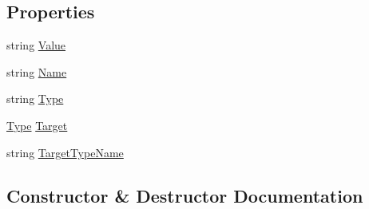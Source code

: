\subsection*{Properties}
\begin{DoxyCompactItemize}
\item 
string \hyperlink{classSystem_1_1Diagnostics_1_1DebuggerDisplayAttribute_abe5f1320ad620a4b6b6d9b7c62e37258_abe5f1320ad620a4b6b6d9b7c62e37258}{Value}
\item 
string \hyperlink{classSystem_1_1Diagnostics_1_1DebuggerDisplayAttribute_a6be7dcf0fb87a9b19c1e29fb1efad0da_a6be7dcf0fb87a9b19c1e29fb1efad0da}{Name}
\item 
string \hyperlink{classSystem_1_1Diagnostics_1_1DebuggerDisplayAttribute_ad096ab5773e9d88ae8f66be51a426fba_ad096ab5773e9d88ae8f66be51a426fba}{Type}
\item 
\hyperlink{classSystem_1_1Diagnostics_1_1DebuggerDisplayAttribute_ad096ab5773e9d88ae8f66be51a426fba_ad096ab5773e9d88ae8f66be51a426fba}{Type} \hyperlink{classSystem_1_1Diagnostics_1_1DebuggerDisplayAttribute_a998ba69e0351bd96028d10f5825f9b91_a998ba69e0351bd96028d10f5825f9b91}{Target}
\item 
string \hyperlink{classSystem_1_1Diagnostics_1_1DebuggerDisplayAttribute_a804f26b8f06e171ae27f7c12917c75bc_a804f26b8f06e171ae27f7c12917c75bc}{Target\+Type\+Name}
\end{DoxyCompactItemize}


\subsection{Constructor \& Destructor Documentation}
\mbox{\label{classSystem_1_1Diagnostics_1_1DebuggerDisplayAttribute_ab455cb09a7bcae8cf3af0e679c14ffe7_ab455cb09a7bcae8cf3af0e679c14ffe7}} 
